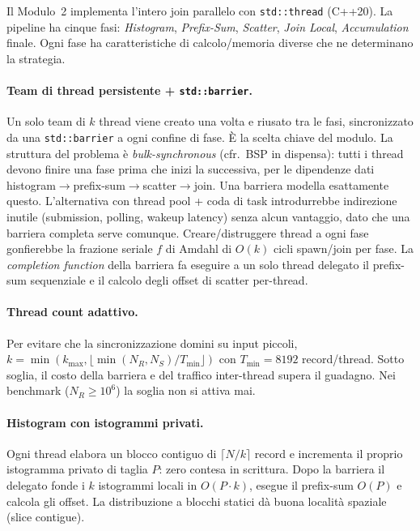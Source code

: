 \documentclass[11pt,a4paper]{article}
\theoremstyle{remark}
\begin{document}
Il Modulo~2 implementa l'intero join parallelo con \texttt{std::thread} (C++20). La pipeline ha cinque fasi: \emph{Histogram}, \emph{Prefix-Sum}, \emph{Scatter}, \emph{Join Local}, \emph{Accumulation} finale. Ogni fase ha caratteristiche di calcolo/memoria diverse che ne determinano la strategia.

\paragraph{Team di thread persistente + \texttt{std::barrier}.} Un solo team di $k$ thread viene creato una volta e riusato tra le fasi, sincronizzato da una \texttt{std::barrier} a ogni confine di fase. \`E la scelta chiave del modulo. La struttura del problema \`e \emph{bulk-synchronous} (cfr.\ BSP in dispensa): tutti i thread devono finire una fase prima che inizi la successiva, per le dipendenze dati histogram$\to$prefix-sum$\to$scatter$\to$join. Una barriera modella esattamente questo. L'alternativa con thread pool + coda di task introdurrebbe indirezione inutile (submission, polling, wakeup latency) senza alcun vantaggio, dato che una barriera completa serve comunque. Creare/distruggere thread a ogni fase gonfierebbe la frazione seriale $f$ di Amdahl di $O(k)$ cicli spawn/join per fase. La \emph{completion function} della barriera fa eseguire a un solo thread delegato il prefix-sum sequenziale e il calcolo degli offset di scatter per-thread.

\paragraph{Thread count adattivo.} Per evitare che la sincronizzazione domini su input piccoli, $k=\min(k_{\max},\lfloor\min(N_R,N_S)/T_{\min}\rfloor)$ con $T_{\min}=8192$ record/thread. Sotto soglia, il costo della barriera e del traffico inter-thread supera il guadagno. Nei benchmark ($N_R\ge 10^6$) la soglia non si attiva mai.

\paragraph{Histogram con istogrammi privati.} Ogni thread elabora un blocco contiguo di $\lceil N/k\rceil$ record e incrementa il proprio istogramma privato di taglia $P$: zero contesa in scrittura. Dopo la barriera il delegato fonde i $k$ istogrammi locali in $O(P\cdot k)$, esegue il prefix-sum $O(P)$ e calcola gli offset. La distribuzione a blocchi statici d\`a buona localit\`a spaziale (slice contigue).
\end{document}
